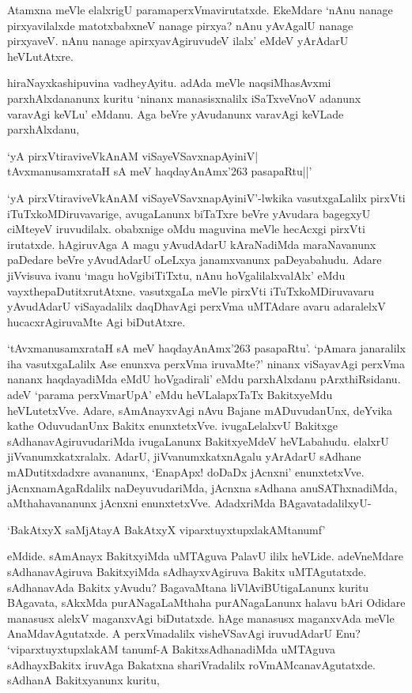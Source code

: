 Atamxna meVle elalxrigU paramaperxVmavirutatxde. EkeMdare `nAnu nanage pirxyavilalxde matotxbabxneV nanage pirxya? nAnu yAvAgalU 
nanage pirxyaveV. nAnu nanage apirxyavAgiruvudeV ilalx' eMdeV yArAdarU heVLutAtxre.

hiraNayxkashipuvina vadheyAyitu. adAda meVle naqsiMhasAvxmi parxhAlxdananunx kuritu `ninanx manasisxnalilx iSaTxveVnoV adanunx varavAgi 
keVLu' eMdanu. Aga beVre yAvudanunx varavAgi keVLade parxhAlxdanu,

\begin{shloka}
`yA pirxVtiraviveVkAnAM viSayeVSavxnapAyiniV|\\
tAvxmanusamxrataH sA meV haqdayAnAmx\char'263 pasapaRtu||'
\end{shloka}

`yA pirxVtiraviveVkAnAM viSayeVSavxnapAyiniV'-lwkika vasutxgaLalilx pirxVti iTuTxkoMDiruvavarige, avugaLanunx biTaTxre beVre yAvudara bagegxyU ciMteyeV 
iruvudilalx. obabxnige oMdu maguvina meVle hecAcxgi pirxVti irutatxde. hAgiruvAga A magu yAvudAdarU kAraNadiMda maraNavanunx paDedare 
beVre yAvudAdarU oLeLxya janamxvanunx paDeyabahudu. Adare jiVvisuva ivanu `magu hoVgibiTiTxtu, nAnu hoVgalilalxvalAlx' eMdu vayxthepaDutitxrutAtxne. 
vasutxgaLa meVle pirxVti iTuTxkoMDiruvavaru yAvudAdarU viSayadalilx daqDhavAgi perxVma uMTAdare avaru adaralelxV hucacxrAgiruvaMte Agi biDutAtxre.

`tAvxmanusamxrataH sA meV haqdayAnAmx\char'263 pasapaRtu'. `pAmara janaralilx iha vasutxgaLalilx Ase enunxva perxVma iruvaMte?' ninanx viSayavAgi perxVma nananx 
haqdayadiMda eMdU hoVgadirali' eMdu parxhAlxdanu pArxthiRsidanu. adeV `parama perxVmarUpA' eMdu heVLalapxTaTx BakitxyeMdu heVLutetxVve. 
Adare, sAmAnayxvAgi nAvu Bajane mADuvudanUnx, deYvika kathe OduvudanUnx Bakitx enunxtetxVve. ivugaLelalxvU Bakitxge sAdhanavAgiruvudariMda 
ivugaLanunx BakitxyeMdeV heVLabahudu. elalxrU jiVvanumxkatxralalx. AdarU, jiVvanumxkatxnAgalu yArAdarU sAdhane mADutitxdadxre avananunx, `EnapApx! doDaDx 
jAcnxni' enunxtetxVve. jAcnxnamAgaRdalilx naDeyuvudariMda, jAcnxna sAdhana anuSAThxnadiMda, aMthahavananunx jAcnxni enunxtetxVve. AdadxriMda BAgavatadalilxyU-

\begin{shloka}
`BakAtxyX saMjAtayA BakAtxyX viparxtuyxtupxlakAMtanumf'
\end{shloka}

eMdide. sAmAnayx BakitxyiMda uMTAguva PalavU ililx heVLide. adeVneMdare sAdhanavAgiruva BakitxyiMda sAdhayxvAgiruva Bakitx uMTAgutatxde. 
sAdhanavAda Bakitx yAvudu? BagavaMtana liVlAviBUtigaLanunx kuritu BAgavata, sAkxMda purANagaLaMthaha purANagaLanunx halavu bAri Odidare manasusx 
alelxV maganxvAgi biDutatxde. hAge manasusx maganxvAda meVle AnaMdavAgutatxde. A perxVmadalilx visheVSavAgi iruvudAdarU Enu? `viparxtuyxtupxlakAM 
tanumf-A BakitxsAdhanadiMda uMTAguva sAdhayxBakitx iruvAga Bakatxna shariVradalilx roVmAMcanavAgutatxde. sAdhanA Bakitxyanunx kuritu,

